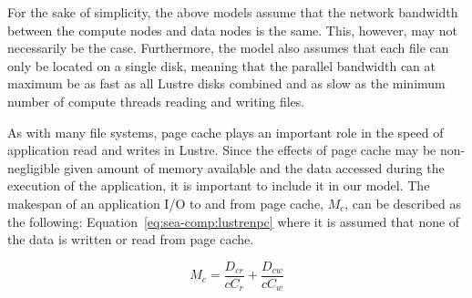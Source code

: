 


      For the sake of simplicity, the above models assume that the network
      bandwidth between the compute nodes and data nodes is the same. This,
      however, may not necessarily be the case. Furthermore, the model also
      assumes that each file can only be located on a single disk, meaning that
      the parallel bandwidth can at maximum be as fast as all Lustre disks
      combined and as slow as the minimum number of compute threads reading and
      writing files.

      As with many file systems, page cache plays an important role in the speed
      of application read and writes in Lustre. Since the effects of page cache
      may be non-negligible given amount of memory available and the data
      accessed during the execution of the application, it is important to
      include it in our model. The makespan of an application I/O to and from
      page cache, $M_{c}$, can be described as the following:
      Equation~\ref{eq:sea-comp:lustrenpc} where it is assumed that none of the
      data is written or read from page cache.


      \begin{equation}\label{eq:sea-comp:cache}
          M_{c} = \frac{D_{cr}}{cC_{r}} + \frac{D_{cw}}{cC_{w}}
      \end{equation}

